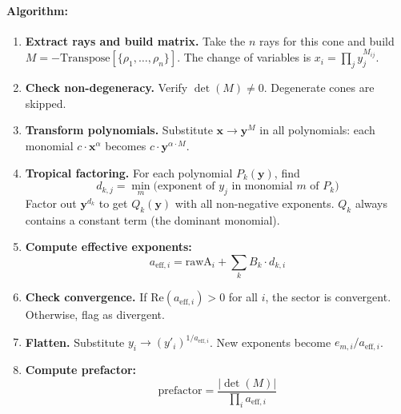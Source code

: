 \documentclass[11pt,a4paper]{article}
\begin{document}
\paragraph{Algorithm:}
\begin{enumerate}
  \item \textbf{Extract rays and build matrix.} Take the $n$ rays for this cone and build $M = -\mathrm{Transpose}[\{\rho_1, \ldots, \rho_n\}]$. The change of variables is $x_i = \prod_j y_j^{M_{ij}}$.

  \item \textbf{Check non-degeneracy.} Verify $\det(M) \neq 0$. Degenerate cones are skipped.

  \item \textbf{Transform polynomials.} Substitute $\mathbf{x} \to \mathbf{y}^M$ in all polynomials: each monomial $c \cdot \mathbf{x}^\alpha$ becomes $c \cdot \mathbf{y}^{\alpha \cdot M}$.

  \item \textbf{Tropical factoring.} For each polynomial $P_k(\mathbf{y})$, find
    \begin{equation}
    d_{k,j} = \min_m \bigl(\text{exponent of } y_j \text{ in monomial } m \text{ of } P_k\bigr)
    \end{equation}
    Factor out $\mathbf{y}^{d_k}$ to get $Q_k(\mathbf{y})$ with all non-negative exponents. $Q_k$ always contains a constant term (the dominant monomial).

  \item \textbf{Compute effective exponents:}
    \begin{equation}
    a_{\mathrm{eff},i} = \mathrm{rawA}_i + \sum_k B_k \cdot d_{k,i}
    \end{equation}

  \item \textbf{Check convergence.} If $\mathrm{Re}(a_{\mathrm{eff},i}) > 0$ for all $i$, the sector is convergent. Otherwise, flag as divergent.

  \item \textbf{Flatten.} Substitute $y_i \to (y'_i)^{1/a_{\mathrm{eff},i}}$. New exponents become $e_{m,i}/a_{\mathrm{eff},i}$.

  \item \textbf{Compute prefactor:}
    \begin{equation}
    \mathrm{prefactor} = \frac{|\det(M)|}{\prod_i a_{\mathrm{eff},i}}
    \end{equation}
\end{enumerate}
\end{document}
